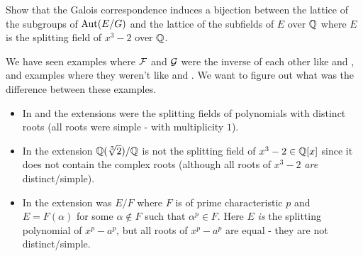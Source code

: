 \documentclass[11pt,a4paper]{article}
\begin{document}
\begin{example}
\begin{enumerate}
\begin{center}
        \end{center}
  \end{enumerate}
\end{example}

\begin{exercise}
  Show that the Galois correspondence induces a bijection between
  the lattice of the subgroups of $\operatorname{Aut}(E/G)$ and the lattice of
  the subfields of $E$ over $\mathbb{Q}$ where $E$ is the splitting field
  of $x^3 - 2$ over $\mathbb{Q}$.
\end{exercise}

\begin{remark}
We have seen examples where $\mathcal F$ and $\mathcal G$ were the inverse of each other
like  and ,
and examples where they weren't like
and .
We want to figure out what was the difference between these examples.

\begin{itemize}
\item
In  and 
the extensions were the splitting fields of polynomials with distinct roots
(all roots were simple - with multiplicity $1$).

\item
In  the extension
$\mathbb{Q}(\sqrt[3]{2}) / \mathbb{Q}$ is not the splitting field of $x^3 - 2 \in \mathbb{Q}[x]$ since
it does not contain the complex roots (although all roots of $x^3 - 2$
\textit{are} distinct/simple).

\item
In 
the extension was $E/F$ where $F$ is of prime characteristic $p$
and $E = F(\alpha)$ for some $\alpha \notin F$ such that $\alpha^p \in F$.
Here $E$ \textit{is} the splitting polynomial of $x^p - a^p$,
but all roots of $x^p - a^p$ are equal - they are not distinct/simple.
\end{itemize}
\end{remark}
\end{document}

